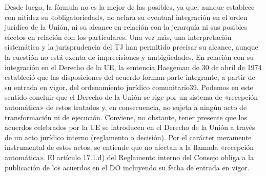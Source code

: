 \documentclass[10pt,a4paper]{article}
\begin{document}
Desde luego, la fórmula no es la mejor de las posibles, ya que, aunque establece con nitidez su «obligatoriedad», no aclara su eventual integración en el orden jurídico de la Unión, ni su alcance en relación con la jerarquía ni sus posibles efectos en relación con los particulares. Una vez más, una interpretación sistemática y la jurisprudencia del TJ han permitido precisar su alcance, aunque la cuestión no está exenta de imprecisiones y ambigüedades. En relación con su integración en el Derecho de la UE, la sentencia Haegeman de 30 de abril de 1974 estableció que las disposiciones del acuerdo forman parte integrante, a partir de su entrada en vigor, del ordenamiento jurídico comunitario39. Podemos en este sentido concluir que el Derecho de la Unión se rige por un sistema de «recepción automática» de estos tratados y, en consecuencia, no sujeta a ningún acto de transformación ni de ejecución. Conviene, no obstante, tener presente que los acuerdos celebrados por la UE se introducen en el Derecho de la Unión a través de un acto jurídico interno (reglamento o decisión). Por el carácter meramente instrumental de estos actos, se entiende que no afectan a la llamada «recepción automática». El artículo 17.1.d) del Reglamento interno del Consejo obliga a la publicación de los acuerdos en el DO incluyendo su fecha de entrada en vigor.
\end{document}
